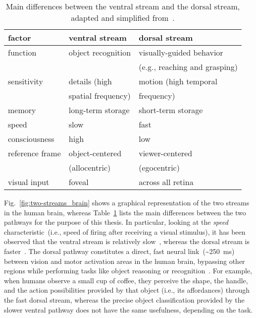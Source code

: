 \begin{table}
\caption[Main differences between the ventral stream and the dorsal stream.]{Main differences between the ventral stream and the dorsal stream, adapted and simplified from~\cite{norman:2002:bbs}.}
\label{tab:two-streams_differences}
\centering
\begin{tabular}{lll}
\toprule
factor & ventral stream & dorsal stream \\
\midrule
function        & object recognition & visually-guided behavior \\
                &                    & (e.g., reaching and grasping) \\
sensitivity     & details (high      & motion (high temporal \\
                & spatial frequency) & frequency) \\
memory          & long-term storage  & short-term storage \\
speed           & slow               & fast \\
consciousness   & high               & low \\
reference frame & object-centered    & viewer-centered \\
                & (allocentric)      & (egocentric) \\
visual input    & foveal             & across all retina \\
\bottomrule
\end{tabular}
\end{table}

Fig.~\ref{fig:two-streams_brain} shows a graphical representation of the two streams in the human brain, whereas Table~\ref{tab:two-streams_differences} lists the main differences between the two pathways for the purpose of this thesis.
In particular, looking at the \emph{speed} characteristic~(i.e., speed of firing after receiving a visual stimulus), it has been observed that the ventral stream is relatively slow~\cite[p.~84]{norman:2002:bbs}, whereas the dorsal stream is faster~\cite{proverbio:2011:neuro}.
The dorsal pathway constitutes a direct, fast neural link~(\textasciitilde250~ms) between vision and motor activation areas in the human brain, bypassing other regions while performing tasks like object reasoning or recognition~\cite{tunik:2007:neuroimage}.
For example, when humans observe a small cup of coffee, they perceive the shape, the handle, and the action possibilities provided by that object (i.e., its affordances) through the fast dorsal stream, whereas the precise object classification provided by the slower ventral pathway does not have the same usefulness, depending on the task.

